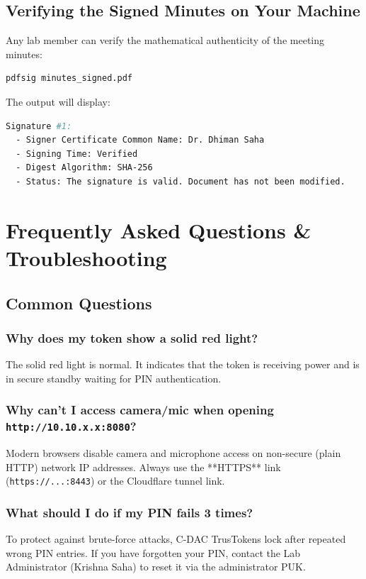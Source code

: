 \documentclass[11pt,a4paper]{report}
\begin{document}
\section{Verifying the Signed Minutes on Your Machine}
Any lab member can verify the mathematical authenticity of the meeting minutes:
\begin{lstlisting}[language=bash]
pdfsig minutes_signed.pdf
\end{lstlisting}
The output will display:
\begin{lstlisting}[language=bash]
Signature #1:
  - Signer Certificate Common Name: Dr. Dhiman Saha
  - Signing Time: Verified
  - Digest Algorithm: SHA-256
  - Status: The signature is valid. Document has not been modified.
\end{lstlisting}

\newpage
\chapter{Frequently Asked Questions \& Troubleshooting}

\section{Common Questions}

\subsection{Why does my token show a solid red light?}
The solid red light is normal. It indicates that the token is receiving power and is in secure standby waiting for PIN authentication.

\subsection{Why can't I access camera/mic when opening \texttt{http://10.10.x.x:8080}?}
Modern browsers disable camera and microphone access on non-secure (plain HTTP) network IP addresses. Always use the **HTTPS** link (\texttt{https://...:8443}) or the Cloudflare tunnel link.

\subsection{What should I do if my PIN fails 3 times?}
To protect against brute-force attacks, C-DAC TrusTokens lock after repeated wrong PIN entries. If you have forgotten your PIN, contact the Lab Administrator (Krishna Saha) to reset it via the administrator PUK.
\end{document}
